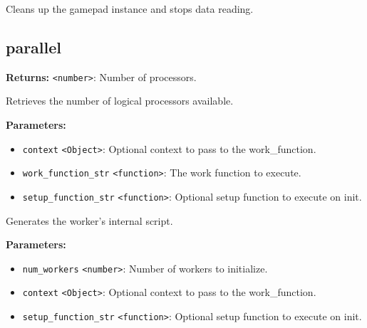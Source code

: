 \documentclass[12pt,a4paper]{article}
\begin{document}
\vspace{5mm}
\noindent {}


\noindent Cleans up the gamepad instance and stops data reading.


\subsection{parallel}
\vspace{5mm}
\noindent {}


\noindent \textbf{Returns:} \texttt{<number>}: Number of processors.

\noindent Retrieves the number of logical processors available.

\vspace{5mm}
\noindent {}


\noindent \textbf{Parameters:}
\begin{itemize}
  \item \texttt{context} \texttt{<Object>}: Optional context to pass to the work\_function.
  \item \texttt{work\_function\_str} \texttt{<function>}: The work function to execute.
  \item \texttt{setup\_function\_str} \texttt{<function>}: Optional setup function to execute on init.
\end{itemize}

\noindent Generates the worker's internal script.

\vspace{5mm}
\noindent {}


\noindent \textbf{Parameters:}
\begin{itemize}
  \item \texttt{num\_workers} \texttt{<number>}: Number of workers to initialize.
  \item \texttt{context} \texttt{<Object>}: Optional context to pass to the work\_function.
  \item \texttt{setup\_function\_str} \texttt{<function>}: Optional setup function to execute on init.
\end{itemize}
\end{document}
